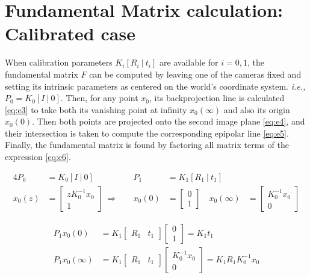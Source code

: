 \documentclass{article}
\begin{document}
\section{Fundamental Matrix calculation: Calibrated case}
When calibration parameters $K_i[R_i ~|~ t_i]$ are available for $i = 0,1$, the fundamental matrix $F$ can be computed by leaving one of the cameras fixed and setting its intrinsic parameters as centered on the world's coordinate system. \textit{i.e.,} $P_0 = K_0[I ~|~ 0]$. Then, for any point $x_0$, its backprojection line is calculated \eqref{eq:e3} to take both its vanishing point at infinity $x_0(\infty)$ and also its origin $x_0(0)$. Then both points are projected onto the second image plane \eqref{eq:e4}, and their intersection is taken to compute the corresponding epipolar line \eqref{eq:e5}. Finally, the fundamental matrix is found by factoring all matrix terms of the expression \eqref{eq:e6}.

\begin{alignat}{4}
\nonumber
P_0 &= K_0 [I ~|~ 0] \quad &P_1 &= K_1 [R_1 ~|~ t_1] \\
x_0(z) &= \begin{bmatrix}
z K_0^{-1} x_0 \\ 1
\end{bmatrix}  ~\Rightarrow \quad &x_0(0) &= \begin{bmatrix}
0 \\ 1
\end{bmatrix} \quad x_0(\infty) &= \begin{bmatrix}
K_0^{-1} x_0 \\ 0
\end{bmatrix} \label{eq:e3}
\end{alignat}  

\begin{equation}
\begin{alignedat}{2}
P_1 x_0(0) &= K_1 \begin{bmatrix}
R_1 & t_1
\end{bmatrix} \begin{bmatrix}
0 \\ 1
\end{bmatrix} = K_1 t_1 \\
P_1 x_0(\infty) &= K_1 \begin{bmatrix}
R_1 & t_1
\end{bmatrix} \begin{bmatrix}
K_0^{-1} x_0 \\ 0
\end{bmatrix} = K_1 R_1 K_0^{-1} x_0
\end{alignedat} \label{eq:e4}
\end{equation}
    
\end{document}
